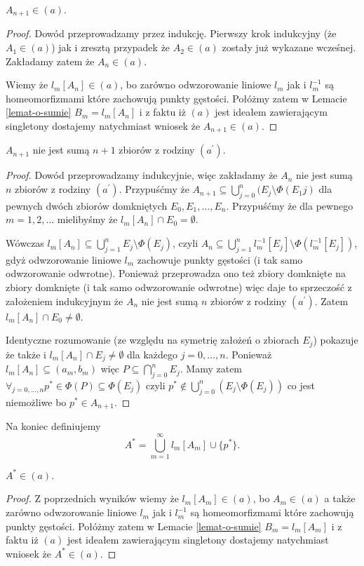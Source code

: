\documentclass[12pt]{amsart}
\theoremstyle{plain}
\theoremstyle{definition}
\theoremstyle{remark}
\newcommand{\aideal}{\mathit{(a)}}
\newcommand{\aidealprime}{\mathit{(a^\prime)}}
\begin{document}
 $A_{n+1} \in \aideal$.
\begin{proof}
Dowód przeprowadzamy przez indukcję. Pierwszy krok indukcyjny 
(że $A_1 \in \aideal$) jak i zresztą przypadek że
$A_2 \in \aideal$ zostały już wykazane wcześnej. 
Zakładamy zatem że $A_n \in \aideal$.

Wiemy że $l_m[A_n] \in \aideal$, bo zarówno odwzorowanie liniowe $l_m$
jak i $l_m^{-1}$ są homeomorfizmami które zachowują punkty gęstości.
Połóżmy zatem w Lemacie \ref{lemat-o-sumie} 
$B_m = l_m[A_n]$ i z faktu iż $\aideal$ jest ideałem
zawierającym singletony dostajemy natychmiast wniosek
że $A_{n+1} \in \aideal$.
\end{proof}

 $A_{n+1}$ nie jest sumą $n + 1$ zbiorów z rodziny $\aidealprime$.
\begin{proof}
Dowód przeprowadzamy indukcyjnie, więc zakładamy że $A_n$ nie jest sumą
$n$ zbiorów z rodziny $\aidealprime$.
Przypuśćmy że $A_{n+1} \subseteq \bigcup_{j=0}^n (E_j \setminus \Phi(E_1j)$
dla pewnych dwóch zbiorów domkniętych $E_0, E_1, \ldots, E_n$.  Przypuśćmy że dla pewnego 
$m = 1,2,\ldots$ mielibyśmy że $l_m[A_n] \cap E_0 = \emptyset$.

Wówczas $l_m[A_n] \subseteq \bigcup_{j=1}^n E_j \setminus \Phi(E_j)$, czyli 
$A_n \subseteq \bigcup_{j=1}^n l_m^{-1}[E_j] \setminus \Phi(l_m^{-1}[E_j])$, gdyż
odwzorowanie liniowe $l_m$ zachowuje punkty gęstości (i tak samo odwzorowanie odwrotne). Ponieważ 
przeprowadza ono też zbiory domknięte na zbiory domknięte (i tak samo odwzorowanie odwrotne)
więc daje to sprzeczość z założeniem indukcyjnym że $A_n$ nie jest sumą $n$ zbiorów z rodziny $\aidealprime$.
Zatem $l_m[A_n] \cap E_0 \not= \emptyset$.

Identyczne rozumowanie (ze względu na symetrię założeń o zbiorach $E_j$)
pokazuje że także i $l_m[A_n] \cap E_j \not= \emptyset$
dla każdego $j = 0, \ldots, n$.
Ponieważ $l_m[A_n] \subseteq (a_m, b_m)$
więc $P \subseteq \bigcap_{j=0}^n E_j$. 
Mamy zatem $\forall_{j=0,\ldots, n} p^* \in \Phi(P) \subseteq \Phi(E_j)$
czyli $p^* \not\in \bigcup_{j=0}^n (E_j \setminus \Phi(E_j))$
co jest niemożliwe bo $p^* \in A_{n+1}$.
\end{proof}

Na koniec definiujemy 
\[ A^* = \bigcup_{m=1}^{\infty} l_m[A_m] \cup \lbrace p^* \rbrace.
\]

 $A^* \in \aideal$.
\begin{proof}
Z poprzednich wyników wiemy że $l_m[A_m] \in \aideal$, bo 
$A_m \in \aideal$ a także zarówno odwzorowanie liniowe $l_m$
jak i $l_m^{-1}$ są homeomorfizmami które zachowują punkty gęstości.
Połóżmy zatem w Lemacie \ref{lemat-o-sumie} 
$B_m = l_m[A_m]$ i z faktu iż $\aideal$ jest ideałem
zawierającym singletony dostajemy natychmiast wniosek
że $A^* \in \aideal$.
\end{proof}

\end{document}
